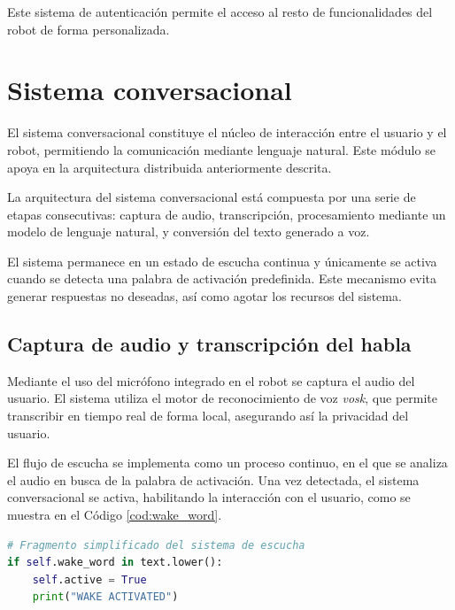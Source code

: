 Este sistema de autenticación permite el acceso al resto de funcionalidades del robot de forma personalizada.


\section{Sistema conversacional}
\label{sec:Sistema conversacional}

El sistema conversacional constituye el núcleo de interacción entre el usuario y el robot, permitiendo la comunicación mediante lenguaje natural. Este módulo se apoya en la arquitectura distribuida anteriormente descrita.

\vspace{0.2cm}

La arquitectura del sistema conversacional está compuesta por una serie de etapas consecutivas: captura de audio, transcripción, procesamiento mediante un modelo de lenguaje natural, y conversión del texto generado a voz.

El sistema permanece en un estado de escucha continua y únicamente se activa cuando se detecta una palabra de activación predefinida. Este mecanismo evita generar respuestas no deseadas, así como agotar los recursos del sistema.

\subsection{Captura de audio y transcripción del habla}

Mediante el uso del micrófono integrado en el robot se captura el audio del usuario. El sistema utiliza el motor de reconocimiento de voz \textit{vosk}, que permite transcribir en tiempo real de forma local, asegurando así la privacidad del usuario.

\vspace{0.2cm}

El flujo de escucha se implementa como un proceso continuo, en el que se analiza el audio en busca de la palabra de activación. Una vez detectada, el sistema conversacional se activa, habilitando la interacción con el usuario, como se muestra en el Código \ref{cod:wake_word}.

\begin{code}[h]
\begin{lstlisting}[language=python]
# Fragmento simplificado del sistema de escucha
if self.wake_word in text.lower():
    self.active = True
    print("WAKE ACTIVATED")
\end{lstlisting}
\caption{Detección de palabra de activación en el sistema de reconocimiento de voz}
\label{cod:wake_word}
\end{code}


